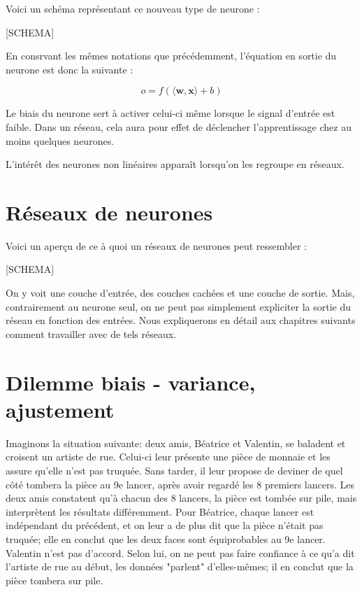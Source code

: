 Voici un schéma représentant ce nouveau type de neurone : 

[SCHEMA]

En consrvant les mêmes notations que précédemment, l'équation en sortie du neurone est donc la suivante : 

\begin{equation}\label{eq:neurone}
o = f(\langle \boldsymbol{w}, \boldsymbol{x} \rangle + b)
\end{equation}

Le biais du neurone sert à activer celui-ci même lorsque le signal d'entrée est faible. Dans un réseau, cela aura pour effet de déclencher l'apprentissage chez au moins quelques neurones.

L'intérêt des neurones non linéaires apparaît lorsqu'on les regroupe en réseaux.

\section{Réseaux de neurones}
Voici un aperçu de ce à quoi un réseaux de neurones peut ressembler :

[SCHEMA]

On y voit une couche d'entrée, des couches cachées et une couche de sortie. Mais, contrairement au neurone seul, on ne peut pas simplement expliciter la sortie du réseau en fonction des entrées. Nous expliquerons en détail aux chapitres suivants comment travailler avec de tels réseaux.


\section{Dilemme biais - variance, ajustement}
Imaginons la situation suivante: deux amis, Béatrice et Valentin, se baladent et croisent un artiste de rue. Celui-ci leur présente une pièce de monnaie et les assure qu'elle n'est pas truquée. Sans tarder, il leur propose de deviner de quel côté tombera la pièce au 9e lancer,  après avoir regardé les 8 premiers lancers. Les deux amis constatent qu'à chacun des 8 lancers, la pièce est tombée sur pile, mais interprètent les résultats différemment. Pour Béatrice, chaque lancer est indépendant du précédent, et on leur a de plus dit que la pièce n'était pas truquée; elle en conclut que les deux faces sont équiprobables au 9e lancer. Valentin n'est pas d'accord. Selon lui, on ne peut pas faire confiance à ce qu'a dit l'artiste de rue au début, les données "parlent" d'elles-mêmes; il en conclut que la pièce tombera sur pile.

